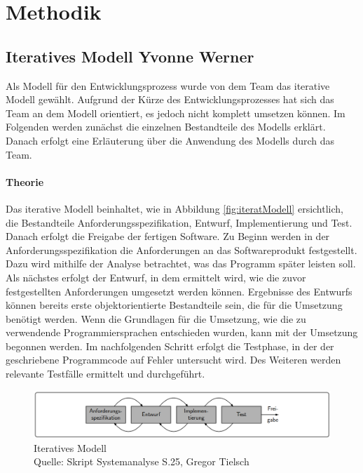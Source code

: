 \chapter{Methodik}

\section[Iteratives Modell]{Iteratives Modell {\hfill \normalsize Yvonne Werner}}
Als Modell für den Entwicklungsprozess wurde von dem Team das iterative Modell gewählt. Aufgrund der Kürze des Entwicklungsprozesses hat sich das Team an dem Modell orientiert, es jedoch nicht komplett umsetzen können. Im Folgenden werden zunächst die einzelnen Bestandteile des Modells erklärt. Danach erfolgt eine Erläuterung über die Anwendung des Modells durch das Team.

\subsubsection{Theorie}
Das iterative Modell beinhaltet, wie in Abbildung \vref{fig:iteratModell} ersichtlich,  die Bestandteile Anforderungsspezifikation, Entwurf, Implementierung und Test. Danach erfolgt die Freigabe der fertigen Software. 
Zu Beginn werden in der Anforderungsspezifikation die Anforderungen an das Softwareprodukt festgestellt. Dazu wird mithilfe der Analyse betrachtet, was das Programm später leisten soll. Als nächstes erfolgt der Entwurf, in dem ermittelt wird, wie die zuvor festgestellten Anforderungen umgesetzt werden können. Ergebnisse des Entwurfs können bereits erste objektorientierte Bestandteile sein, die für die Umsetzung benötigt werden. Wenn die Grundlagen für die Umsetzung, wie die zu verwendende Programmiersprachen entschieden wurden, kann mit der Umsetzung begonnen werden. Im nachfolgenden Schritt erfolgt die Testphase, in der der geschriebene Programmcode auf Fehler untersucht wird. Des Weiteren werden relevante Testfälle ermittelt und durchgeführt. 
\begin{figure}[H]
	\centering 
	\includegraphics[width=14cm]{img/iterativesModell.png}
	\captionsetup{format=hang}
	\centering\caption[Iteratives Modell]{\label{fig:iteratModell}Iteratives Modell \\Quelle: Skript Systemanalyse S.25, Gregor Tielsch}
\end{figure}

